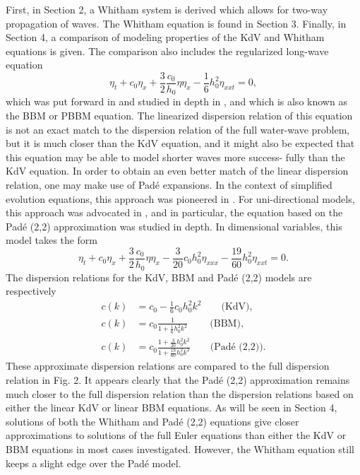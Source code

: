 First, in Section 2, a Whitham system is derived which allows for
two-way propagation of waves. The Whitham equation is found in
Section 3. Finally, in Section 4, a comparison of modeling properties
of the KdV and Whitham equations is given. The comparison also
includes the regularized long-wave equation
%
\begin{equation}
	\eta_t + c_0 \eta_x + \frac{3}{2} \frac{c_0}{h_0} \eta \eta_x - \frac{1}{6} h_0^2 			\eta_{xxt} = 0,
	\label{regularized-long-wave}
\end{equation}
%
which was put forward in \cite{Peregrine1966} and studied in depth in \cite{Benjamin1972}, and
which is also known as the BBM or PBBM equation. The linearized
dispersion relation of this equation is not an exact match to the
dispersion relation of the full water-wave problem, but it is much
closer than the KdV equation, and it might also be expected that
this equation may be able to model shorter waves more success-
fully than the KdV equation. In order to obtain an even better match
of the linear dispersion relation, one may make use of Pad\'e  expansions. In the context of simplified evolution equations, this
approach was pioneered in \cite{Witting1984}. For uni-directional models, this
approach was advocated in \cite{Fetecau2005}, and in particular, the equation
based on the Pad\'e (2,2) approximation was studied in depth. In dimensional variables, this model takes the form
%
\begin{equation}
	\eta_t + c_0 \eta_x + \frac{3}{2} \frac{c_0}{h_0} \eta \eta_x
	- \frac{3}{20} c_0 h_0^2 \eta_{xxx} - \frac{19}{60} h_0^2 \eta_{xxt} = 0.
	\label{pade-2-2}
\end{equation}
%
The dispersion relations for the KdV, BBM and Pad\'e (2,2) models are respectively
%
\begin{align*}
	c(k) & = c_0 - \frac{1}{6} c_0 h_0^2 k^2 \qquad \mbox{(KdV)}, \\
	c(k) & = c_0 \frac{1}{1 + \frac{1}{6} h_0^2 k^2} \qquad ~\mbox{(BBM)}, \\
	c(k) & = c_0 \frac{1 + \frac{3}{20} h_0^2 k^2}{1 + \frac{19}{60} h_0^2 k^2} \qquad 			\mbox{(Pad\'e (2,2))}.
	\label{dispersive-relations}
\end{align*}
%
These approximate dispersion relations are compared to the full
dispersion relation in Fig. 2. It appears clearly that the Pad\'e (2,2)
approximation remains much closer to the full dispersion relation than the dispersion relations based on either the linear KdV
or linear BBM equations. As will be seen in Section 4, solutions of
both the Whitham and Pad\'e (2,2) equations give closer approximations to solutions of the full Euler equations than either the KdV or
BBM equations in most cases investigated. However, the Whitham
equation still keeps a slight edge over the Pad\'e model.

